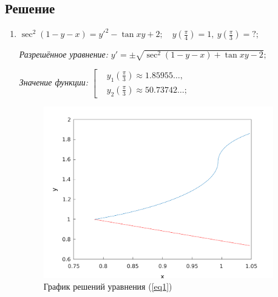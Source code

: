 \documentclass[14pt, a4paper, titlepage, fleqn]{extarticle}
\begin{document}
        
        \subsection{Решение}
            \begin{enumerate}
                \item \( \sec^2{(1 -y- x)} = y'^2 - \tan{xy} + 2; \quad y \left( \frac{\pi}{4} \right) = 1, ~ y \left( \frac{\pi}{3} \right) = ?;  \)
                    \label{eq1}

                    \textit{Разрешённое уравнение:}
                        \( y' = \pm \sqrt{\sec^2 \left( 1 - y - x \right) + \tan{xy} - 2}; \)

                    \textit{Значение функции:}
                        \(  \left[
                            \begin{aligned}
                                &y_1\left( \frac{\pi}{3} \right) \approx 1.85955\dots, \\
                                &y_2\left( \frac{\pi}{3} \right) \approx 50.73742\dots;
                            \end{aligned}
                        \right. \)

                    \begin{figure}[H]
                        \centering
                        \includegraphics[width=10cm]{pictures/graph2_1.pdf}
                        \caption{График решений уравнения (\ref{eq1})}
                    \end{figure}

                    \pagebreak
                    


\end{enumerate}
\end{document}
